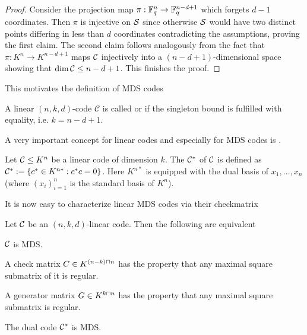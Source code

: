 \begin{proof}
    Consider the projection map $\pi:\mathbb{F}_{q}^n\rightarrow\mathbb{F}_{q}^{n-d+1}$ which forgets $d-1$ coordinates.
    Then $\pi$ is injective on $\mathcal{S}$ since otherwise $\mathcal{S}$ would have two distinct points differing in less than $d$ coordinates contradicting the assumptions, proving the first claim.
    The second claim follows analogously from the fact that $\pi:K^n\to K^{n-d+1}$ maps $\mathcal{C}$ injectively into a $(n-d+1)$-dimensional space showing that $\dim{\mathcal{C}}\leq n-d+1$.
    This finishes the proof.
\end{proof}

This motivates the definition of MDS codes

\begin{definition}
    A linear $(n,k,d)$-code $\mathcal{C}$ is called  or  if the singleton bound is fulfilled with equality, i.e. $k=n-d+1$. 
\end{definition}

A very important concept for linear codes and especially for MDS codes is .

\begin{definition}\label{lincode-dual}
    Let $\mathcal{C}\leq K^n$ be a linear code of dimension $k$. The  $\mathcal{C}^{\ast}$ of $\mathcal{C}$ is defined as $\mathcal{C}^{\ast}:=\left\{c^{\ast}\in K^{n\ast}:c^{\ast}c=0\right\}$. Here $K^{n\ast}$ is equipped with the dual basis of $x_1,\ldots,x_n$ (where ${(x_i)}_{i=1}^n$ is the standard basis of $K^n$).
\end{definition}

It is now easy to characterize linear MDS codes via their checkmatrix

\begin{lemma}\label{mdschar}
    Let $\mathcal{C}$ be an $(n,k,d)$-linear code. Then the following are equivalent
    \begin{statements}
            \item\label{mds} $\mathcal{C}$ is MDS.
            \item\label{mds-chkmtrx} A check matrix $C \in K^{(n-k)\settimes n}$ has the property that any maximal square submatrix of it is regular.
            \item\label{mds-gmtrx} A generator matrix $G \in K^{k\settimes n}$ has the property that any maximal square submatrix is regular.
            \item\label{mds-dual} The dual code $\mathcal{C}^{\ast}$ is MDS.
    \end{statements}
\end{lemma}

